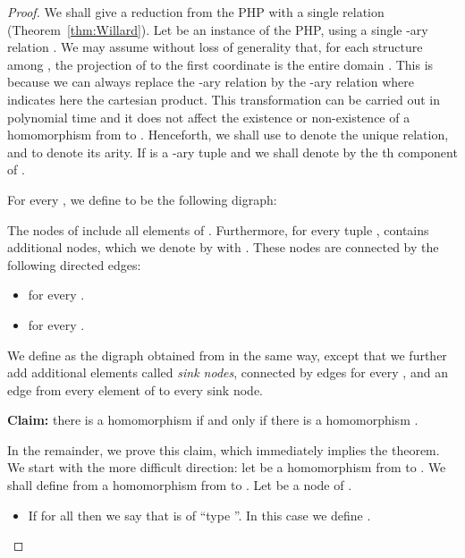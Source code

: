 \documentclass{article}
\begin{document}
\begin{proof}
  We shall give a reduction from the PHP with a single
  relation (Theorem~\ref{thm:Willard}). Let  be
  an instance of the PHP, using a single -ary relation . We may
  assume without loss of generality that, for each structure
    among  , the projection of
   to the first coordinate is the entire domain .
  This is because we can always replace the -ary relation  by
  the
  -ary relation  where 
  indicates here the cartesian product.
 This
  transformation can be carried out in polynomial time and it does not affect
  the existence or non-existence of a homomorphism from
   to .
Henceforth, we shall use  to denote the unique relation, and  to
denote its arity. 
If  is a -ary tuple and  we shall denote by  the th component of .

For every , we define  to be the following digraph:


The nodes of  include all elements of . Furthermore,
for every tuple ,  contains 
additional nodes, which we
denote by  with .
 These nodes are connected by
the following directed edges:
\begin{itemize}

\item  for every .

\item  for every .

\end{itemize}



We define  as  the digraph obtained from  in the
same way, except that we further add 
 additional elements  called {\em sink nodes},
connected by edges  for every , and 
an edge from every element of  to every sink node.

\begin{trivlist}
\item \textbf{Claim:} there is a homomorphism  if and only if
  there is a homomorphism .
\end{trivlist}

In the remainder, we prove this claim,
which immediately implies the theorem. 
We start with the more difficult direction: let  be a homomorphism from  to .  We shall define from  a homomorphism  from  to . Let  be a node of  . 



\begin{itemize}

\item If  for all  then we say that  is of ``type ''. In this case we define .


\end{itemize}
\end{proof}
\end{document}
